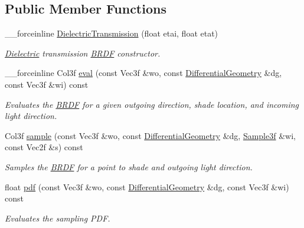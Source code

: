 \subsection*{Public Member Functions}
\begin{DoxyCompactItemize}
\item 
\_\-\_\-forceinline \hyperlink{classembree_1_1_dielectric_transmission_af023dc3952b29232b403de1cc78c62a1}{DielectricTransmission} (float etai, float etat)
\begin{DoxyCompactList}\small\item\em \hyperlink{classembree_1_1_dielectric}{Dielectric} transmission \hyperlink{classembree_1_1_b_r_d_f}{BRDF} constructor. \item\end{DoxyCompactList}\item 
\_\-\_\-forceinline Col3f \hyperlink{classembree_1_1_dielectric_transmission_af177756fbc0f450adc10197863a496e9}{eval} (const Vec3f \&wo, const \hyperlink{structembree_1_1_differential_geometry}{DifferentialGeometry} \&dg, const Vec3f \&wi) const 
\begin{DoxyCompactList}\small\item\em Evaluates the \hyperlink{classembree_1_1_b_r_d_f}{BRDF} for a given outgoing direction, shade location, and incoming light direction. \item\end{DoxyCompactList}\item 
Col3f \hyperlink{classembree_1_1_dielectric_transmission_ad588706fe4b14c0272db64d9eebde531}{sample} (const Vec3f \&wo, const \hyperlink{structembree_1_1_differential_geometry}{DifferentialGeometry} \&dg, \hyperlink{structembree_1_1_sample}{Sample3f} \&wi, const Vec2f \&s) const 
\begin{DoxyCompactList}\small\item\em Samples the \hyperlink{classembree_1_1_b_r_d_f}{BRDF} for a point to shade and outgoing light direction. \item\end{DoxyCompactList}\item 
float \hyperlink{classembree_1_1_dielectric_transmission_a3e3eed88a0193d94f31b8c8a710507ec}{pdf} (const Vec3f \&wo, const \hyperlink{structembree_1_1_differential_geometry}{DifferentialGeometry} \&dg, const Vec3f \&wi) const 
\begin{DoxyCompactList}\small\item\em Evaluates the sampling PDF. \item\end{DoxyCompactList}\end{DoxyCompactItemize}


